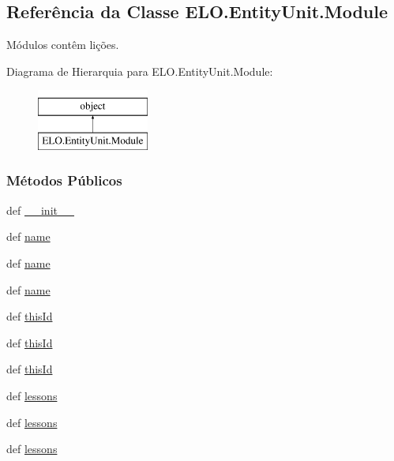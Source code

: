 \hypertarget{classELO_1_1EntityUnit_1_1Module}{\subsection{Referência da Classe E\-L\-O.\-Entity\-Unit.\-Module}
\label{classELO_1_1EntityUnit_1_1Module}
}


Módulos contêm lições.  


Diagrama de Hierarquia para E\-L\-O.\-Entity\-Unit.\-Module\-:\begin{figure}[H]
\begin{center}
\leavevmode
\includegraphics[height=2.000000cm]{db/de8/classELO_1_1EntityUnit_1_1Module}
\end{center}
\end{figure}
\subsubsection*{Métodos Públicos}
\begin{DoxyCompactItemize}
\item 
def \hyperlink{classELO_1_1EntityUnit_1_1Module_ae99b8d113f1b21fcac85063ba5599e35}{\-\_\-\-\_\-init\-\_\-\-\_\-}
\item 
def \hyperlink{classELO_1_1EntityUnit_1_1Module_aacb77acc28005833928a7c6f971f44b5}{name}
\item 
def \hyperlink{classELO_1_1EntityUnit_1_1Module_aacb77acc28005833928a7c6f971f44b5}{name}
\item 
def \hyperlink{classELO_1_1EntityUnit_1_1Module_aacb77acc28005833928a7c6f971f44b5}{name}
\item 
def \hyperlink{classELO_1_1EntityUnit_1_1Module_a7833604c3c13e2fdc5f4bce8712c2118}{this\-Id}
\item 
def \hyperlink{classELO_1_1EntityUnit_1_1Module_a7833604c3c13e2fdc5f4bce8712c2118}{this\-Id}
\item 
def \hyperlink{classELO_1_1EntityUnit_1_1Module_a7833604c3c13e2fdc5f4bce8712c2118}{this\-Id}
\item 
def \hyperlink{classELO_1_1EntityUnit_1_1Module_a4b12f83ecbf3722070716c9ca5adb80a}{lessons}
\item 
def \hyperlink{classELO_1_1EntityUnit_1_1Module_a4b12f83ecbf3722070716c9ca5adb80a}{lessons}
\item 
def \hyperlink{classELO_1_1EntityUnit_1_1Module_a4b12f83ecbf3722070716c9ca5adb80a}{lessons}
\end{DoxyCompactItemize}
